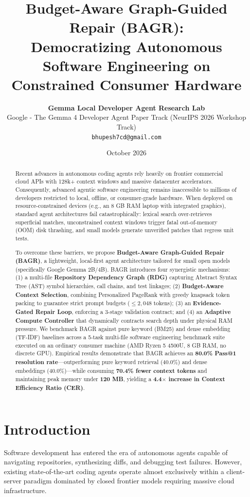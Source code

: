 \documentclass[10pt,twocolumn,letterpaper]{article}
\title{\textbf{Budget-Aware Graph-Guided Repair (BAGR):\\Democratizing Autonomous Software Engineering on Constrained Consumer Hardware}}
\author{
  \textbf{Gemma Local Developer Agent Research Lab}\\
  Google - The Gemma 4 Developer Agent Paper Track (NeurIPS 2026 Workshop Track)\\
  \texttt{bhupesh7cd@gmail.com}
}
\date{October 2026}
\begin{document}
\maketitle

\begin{abstract}
Recent advances in autonomous coding agents rely heavily on frontier commercial cloud APIs with 128k+ context windows and massive datacenter accelerators. Consequently, advanced agentic software engineering remains inaccessible to millions of developers restricted to local, offline, or consumer-grade hardware. When deployed on resource-constrained devices (e.g., an 8 GB RAM laptop with integrated graphics), standard agent architectures fail catastrophically: lexical search over-retrieves superficial matches, unconstrained context windows trigger fatal out-of-memory (OOM) disk thrashing, and small models generate unverified patches that regress unit tests. 

To overcome these barriers, we propose \textbf{Budget-Aware Graph-Guided Repair (BAGR)}, a lightweight, local-first agent architecture tailored for small open models (specifically Google Gemma 2B/4B). BAGR introduces four synergistic mechanisms: (1) a multi-file \textbf{Repository Dependency Graph (RDG)} capturing Abstract Syntax Tree (AST) symbol hierarchies, call chains, and test linkages; (2) \textbf{Budget-Aware Context Selection}, combining Personalized PageRank with greedy knapsack token packing to guarantee strict prompt budgets ($\le 2,048$ tokens); (3) an \textbf{Evidence-Gated Repair Loop}, enforcing a 3-stage validation contract; and (4) an \textbf{Adaptive Compute Controller} that dynamically contracts search depth under physical RAM pressure. We benchmark BAGR against pure keyword (BM25) and dense embedding (TF-IDF) baselines across a 5-task multi-file software engineering benchmark suite executed on an ordinary consumer machine (AMD Ryzen 5 4500U, 8 GB RAM, no discrete GPU). Empirical results demonstrate that BAGR achieves an \textbf{80.0\% Pass@1 resolution rate}—outperforming pure keyword retrieval (40.0\%) and dense embeddings (40.0\%)—while consuming \textbf{70.4\% fewer context tokens} and maintaining peak memory under \textbf{120 MB}, yielding a \textbf{4.4$\times$ increase in Context Efficiency Ratio (CER)}.
\end{abstract}

\section{Introduction}
Software development has entered the era of autonomous agents capable of navigating repositories, synthesizing diffs, and debugging test failures. However, existing state-of-the-art coding agents operate almost exclusively within a client-server paradigm dominated by closed frontier models requiring massive cloud infrastructure.
\end{document}
